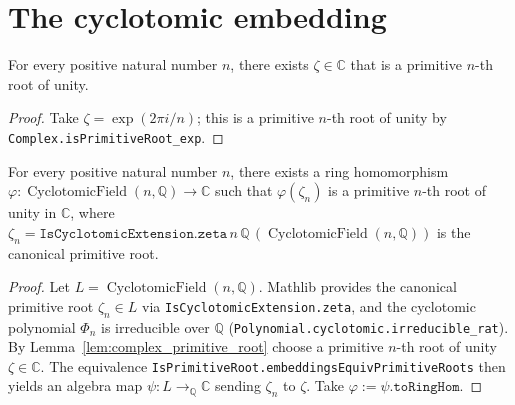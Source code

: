 \section{The cyclotomic embedding}

\begin{lemma}
    \label{lem:complex_primitive_root}
    \leanok
    For every positive natural number $n$, there exists $\zeta \in \mathbb{C}$
    that is a primitive $n$-th root of unity.
\end{lemma}
\begin{proof}
    Take $\zeta = \exp(2 \pi i / n)$; this is a primitive $n$-th root of unity
    by \texttt{Complex.isPrimitiveRoot\_exp}.
\end{proof}

\begin{lemma}
    \label{lem:cyclotomic_embedding}
    \leanok
    For every positive natural number $n$, there exists a ring homomorphism
    $\varphi : \operatorname{CyclotomicField}(n, \mathbb{Q}) \to \mathbb{C}$
    such that $\varphi(\zeta_n)$ is a primitive $n$-th root of unity in
    $\mathbb{C}$, where $\zeta_n = \texttt{IsCyclotomicExtension.zeta}\,n\,\mathbb{Q}\,(\operatorname{CyclotomicField}(n,\mathbb{Q}))$
    is the canonical primitive root.
\end{lemma}
\begin{proof}
    Let $L = \operatorname{CyclotomicField}(n, \mathbb{Q})$. Mathlib provides the
    canonical primitive root $\zeta_n \in L$ via
    \texttt{IsCyclotomicExtension.zeta}, and the cyclotomic polynomial
    $\Phi_n$ is irreducible over $\mathbb{Q}$
    (\texttt{Polynomial.cyclotomic.irreducible\_rat}). By
    Lemma~\ref{lem:complex_primitive_root} choose a primitive $n$-th root of
    unity $\zeta \in \mathbb{C}$. The equivalence
    \texttt{IsPrimitiveRoot.embeddingsEquivPrimitiveRoots} then yields an
    algebra map $\psi : L \to_\mathbb{Q} \mathbb{C}$ sending $\zeta_n$ to
    $\zeta$. Take $\varphi := \psi.\texttt{toRingHom}$.
\end{proof}


